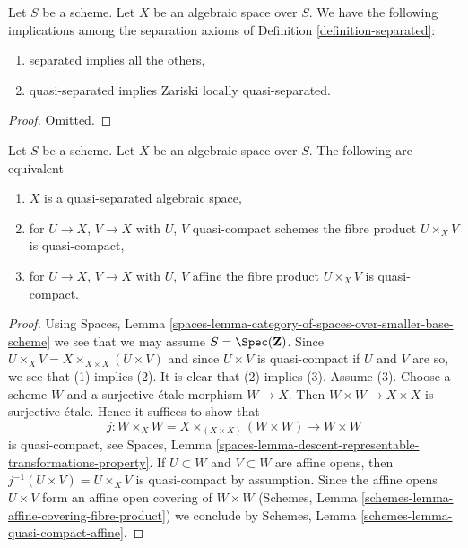 \begin{lemma}
\label{lemma-trivial-implications}
Let $S$ be a scheme.
Let $X$ be an algebraic space over $S$.
We have the following implications among the separation axioms
of Definition \ref{definition-separated}:
\begin{enumerate}
\item separated implies all the others,
\item quasi-separated implies Zariski locally quasi-separated.
\end{enumerate}
\end{lemma}

\begin{proof}
Omitted.
\end{proof}

\begin{lemma}
\label{lemma-characterize-quasi-separated}
Let $S$ be a scheme. Let $X$ be an algebraic space over $S$.
The following are equivalent
\begin{enumerate}
\item $X$ is a quasi-separated algebraic space,
\item for $U \to X$, $V \to X$ with $U$, $V$ quasi-compact schemes
the fibre product $U \times_X V$ is quasi-compact,
\item for $U \to X$, $V \to X$ with $U$, $V$ affine
the fibre product $U \times_X V$ is quasi-compact.
\end{enumerate}
\end{lemma}

\begin{proof}
Using Spaces, Lemma
\ref{spaces-lemma-category-of-spaces-over-smaller-base-scheme}
we see that we may assume $S = \Spec(\mathbf{Z})$.
Since $U \times_X V = X \times_{X \times X} (U \times V)$
and since $U \times V$ is quasi-compact if $U$ and $V$ are so,
we see that (1) implies (2). It is clear that (2) implies (3).
Assume (3). Choose a scheme $W$ and a surjective \'etale morphism
$W \to X$. Then $W \times W \to X \times X$ is surjective \'etale.
Hence it suffices to show that
$$
j : W \times_X W = X \times_{(X \times X)} (W \times W) \to W \times W
$$
is quasi-compact, see Spaces, Lemma
\ref{spaces-lemma-descent-representable-transformations-property}.
If $U \subset W$ and $V \subset W$ are affine opens, then
$j^{-1}(U \times V) = U \times_X V$ is quasi-compact by assumption.
Since the affine opens $U \times V$ form an affine open covering of
$W \times W$ (Schemes, Lemma \ref{schemes-lemma-affine-covering-fibre-product})
we conclude by
Schemes, Lemma \ref{schemes-lemma-quasi-compact-affine}.
\end{proof}


